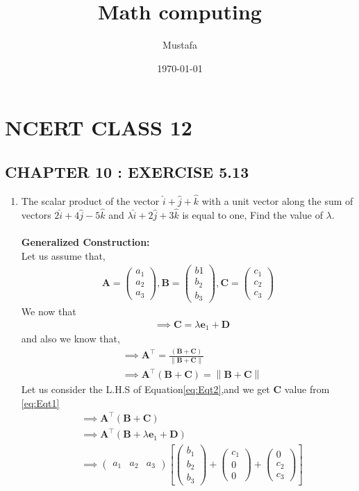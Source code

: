 \documentclass[10pt, a4paper]{article}
\title{ Math computing}
\author{ Mustafa}
\date{\today}
\newcommand{\myvec}[1]{\ensuremath{\begin{pmatrix}#1\end{pmatrix}}}
\let\vec\mathbf
\providecommand{\brak}[1]{\ensuremath{\left(#1\right)}}
\providecommand{\sbrak}[1]{\ensuremath{{}\left[#1\right]}}
\providecommand{\norm}[1]{\left\lVert#1\right\rVert}
\begin{document}
\section*{NCERT CLASS 12}
\subsection*{CHAPTER 10 : EXERCISE 5.13}
\begin{enumerate}
\item\textbf{}The scalar product of the vector $\hat{i}+\hat{j}+\hat{k}$ with a unit vector along the sum of vectors $2\hat{i}+4\hat{j}-5\hat{k}$ and $\lambda\hat{i}+2\hat{j}+3\hat{k}$ is equal to one, Find the value of $\lambda$.
\\\\
\textbf{Generalized Construction:}\\
Let us assume that,
\begin{align}
\vec{A} =\myvec{a_1\\a_2\\a_3} , \vec{B}=\myvec{b1\\b_2\\b_3} , \vec{C}=\myvec{c_1\\c_2\\c_3}
\end{align}
We now that \\
\begin{align}
	&\implies \vec{C}=\lambda \vec{e}_1+\vec{D}\label{eq:Eqt1}
    \end{align}
and also we know that,
\begin{align}
       &\implies \vec{A}^\top = \frac{\brak{\vec{B}+\vec{C}}}{\norm{\vec{B}+\vec{C}}}\\
       &\implies \vec{A}^\top \brak{\vec{B}+\vec{C}}=\norm{\vec{B}+\vec{C}} \label{eq:Eqt2}
\end{align}
Let us consider the L.H.S of Equation\eqref{eq:Eqt2},and we get $\vec{C}$ value from \eqref{eq:Eqt1}
\begin{align}
    &\implies \vec{A}^\top \brak{\vec{B}+\vec{C}}\\
	&\implies \vec{A}^\top \brak{\vec{B}+\lambda \vec{e}_1+\vec{D}}\\
   &\implies \myvec{a_1&a_2&a_3}\sbrak{\myvec{b_1\\b_2\\b_3}+\myvec{c_1\\0\\0}+\myvec{0\\c_2\\c_3}}\\

\end{align}
\end{enumerate}
\end{document}
